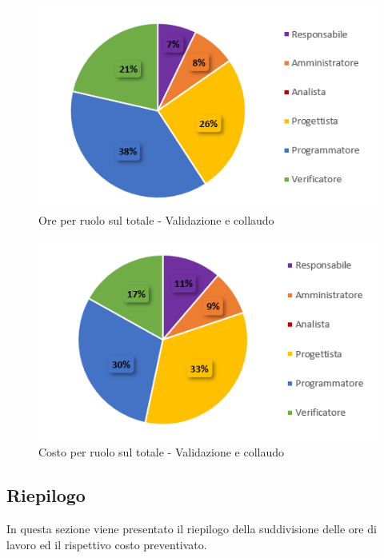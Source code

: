 \begin{figure}[H]
  \centering
  \includegraphics[scale=0.8]{immagini/ore_ruolo_Validazione.png}
  \caption{Ore per ruolo sul totale - Validazione e collaudo}
\end{figure}

\begin{figure}[H]
  \centering
  \includegraphics[scale=0.8]{immagini/costo_ruolo_validazione.png}
  \caption{Costo per ruolo sul totale - Validazione e collaudo}
\end{figure}

\subsection{Riepilogo} \label{subsection:preventivo_riepilogo}
In questa sezione viene presentato il riepilogo della suddivisione delle ore di lavoro ed il rispettivo costo preventivato.

